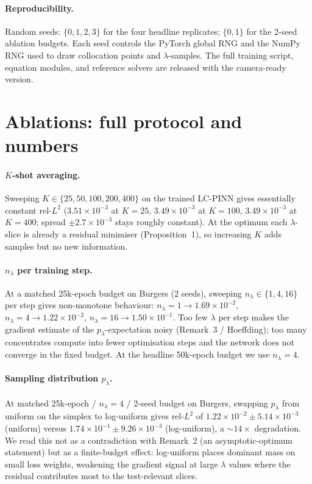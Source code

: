 \paragraph{Reproducibility.}
Random seeds: $\{0, 1, 2, 3\}$ for the four headline replicates;
$\{0, 1\}$ for the 2-seed ablation budgets. Each seed controls the
PyTorch global RNG and the NumPy RNG used to draw collocation
points and $\lambda$-samples. The full training script, equation
modules, and reference solvers are released with the
camera-ready version.

\section{Ablations: full protocol and numbers}
\label{sec:appendix-ablations}

\paragraph{$K$-shot averaging.}
Sweeping $K \in \{25, 50, 100, 200, 400\}$ on the trained LC-PINN
gives essentially constant rel-$L^2$ ($3.51\!\times\!10^{-3}$ at
$K\!=\!25$, $3.49\!\times\!10^{-3}$ at $K\!=\!100$,
$3.49\!\times\!10^{-3}$ at $K\!=\!400$; spread
$\pm 2.7\!\times\!10^{-3}$ stays roughly constant). At the optimum
each $\lambda$-slice is already a residual minimiser
(Proposition~1), so increasing $K$ adds samples but no new
information.

\paragraph{$n_\lambda$ per training step.}
At a matched 25k-epoch budget on Burgers (2 seeds), sweeping
$n_\lambda \!\in\! \{1, 4, 16\}$ per step gives non-monotone
behaviour: $n_\lambda\!=\!1\!\to\!1.69\!\times\!10^{-2}$,
$n_\lambda\!=\!4\!\to\!1.22\!\times\!10^{-2}$,
$n_\lambda\!=\!16\!\to\!1.50\!\times\!10^{-1}$. Too few
$\lambda$ per step makes the gradient estimate of the
$p_\lambda$-expectation noisy (Remark~3 / Hoeffding); too many
concentrates compute into fewer optimisation steps and the network
does not converge in the fixed budget. At the headline 50k-epoch
budget we use $n_\lambda\!=\!4$.

\paragraph{Sampling distribution $p_\lambda$.}
At matched 25k-epoch / $n_\lambda\!=\!4$ / 2-seed budget on
Burgers, swapping $p_\lambda$ from uniform on the simplex to
log-uniform gives rel-$L^2$ of
$1.22\!\times\!10^{-2} \pm 5.14\!\times\!10^{-3}$ (uniform) versus
$1.74\!\times\!10^{-1} \pm 9.26\!\times\!10^{-3}$ (log-uniform), a
$\sim\!14\times$ degradation. We read this not as a contradiction
with Remark~2 (an asymptotic-optimum statement) but as a
finite-budget effect: log-uniform places dominant mass on small
loss weights, weakening the gradient signal at large $\lambda$
values where the residual contributes most to the test-relevant
slices.


